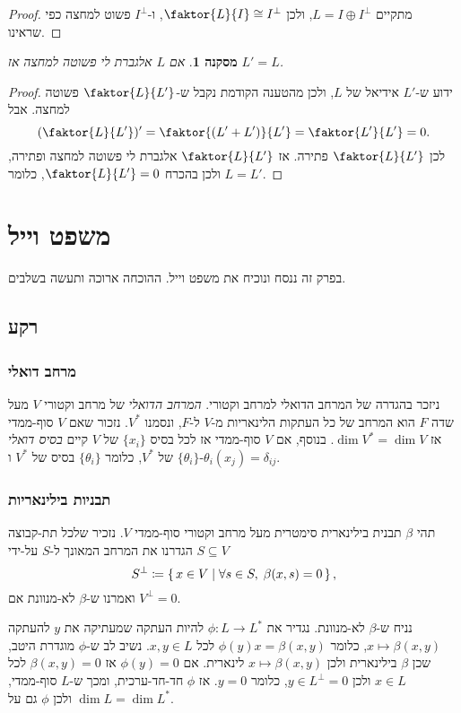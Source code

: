 \documentclass{report}
\theoremstyle{break}
\newtheorem{corollary}[corollary]{מסקנה}
\theoremstyle{MyNonumberbreak}
\newtheorem{proof}{הוכחה}
\begin{document}
\begin{proof}
	מתקיים $L = I \oplus I^\perp$, ולכן $\faktor{L}{I} \cong I^\perp$, ו-$I^\perp$ פשוט למחצה כפי שראינו.
\end{proof}
\begin{corollary} \label{prep:derived-semisimple}
	אם $L$ אלגברת לי פשוטה למחצה אז $L' = L$.
\end{corollary}
\begin{proof}
	ידוע ש-$L'$ אידיאל של $L$, ולכן מהטענה הקודמת נקבל ש-$\faktor{L}{L'}$ פשוטה למחצה. אבל
	\[ (\faktor{L}{L'})' = \faktor{(L' + L')}{L'} = \faktor{L'}{L'} = 0. \]
	לכן $\faktor{L}{L'}$ פתירה. אז $\faktor{L}{L'}$ אלגברת לי פשוטה למחצה ופתירה, ולכן בהכרח $\faktor{L}{L'} = 0$, כלומר $L = L'$.
\end{proof}


\chapter{משפט וייל}
בפרק זה ננסח ונוכיח את משפט וייל. ההוכחה ארוכה ותעשה בשלבים.

\section{רקע} \label{sec:weyl-preliminaries}
\subsection{מרחב דואלי}
ניזכר בהגדרה של המרחב הדואלי למרחב וקטורי. \textit{המרחב הדואלי} של מרחב וקטורי $V$ מעל שדה $F$ הוא המרחב של כל העתקות הלינאריות מ-$V$ ל-$F$, ונסמנו $V^*$. נזכור שאם $V$ סוף-ממדי אז $\dim V^* = \dim V$. בנוסף, אם $V$ סוף-ממדי אז לכל בסיס $\{x_i\}$ של $V$ קיים \textit{בסיס דואלי} $\{\theta_i\}$ של $V^*$, כלומר $\{\theta_i\}$ בסיס של $V^*$ ו-$\theta_i(x_j) = \delta_{ij}$.
\subsection{תבניות בילינאריות}
תהי $\beta$ תבנית בילינארית סימטרית מעל מרחב וקטורי סוף-ממדי $V$. נזכיר שלכל תת-קבוצה $S\subseteq V$ הגדרנו את המרחב המאונך ל-$S$ על-ידי
\[ S^\perp \coloneqq \set{x \in V | \forall s \in S, \; \beta(x, s) = 0}, \]
ואמרנו ש-$\beta$ לא-מנוונת אם $V^\perp = 0$.

נניח ש-$\beta$ לא-מנוונת. נגדיר את $\phi : L \to L^*$ להיות העתקה שמעתיקה את $y$ להעתקה $x \mapsto \beta(x, y)$, כלומר $\phi(y)x = \beta(x, y)$ לכל $x, y \in L$. נשיב לב ש-$\phi$ מוגדרת היטב, שכן $\beta$ בילינארית ולכן $x \mapsto \beta(x, y)$ לינארית. אם $\phi(y) = 0$ אז $\beta(x, y) = 0$ לכל $x \in L$ ולכן $y \in L^\perp = 0$, כלומר $y = 0$. אז $\phi$ חד-חד-ערכית, ומכך ש-$L$ סוף-ממדי, $\dim L = \dim L^*$ ולכן $\phi$ גם על.
\end{document}
